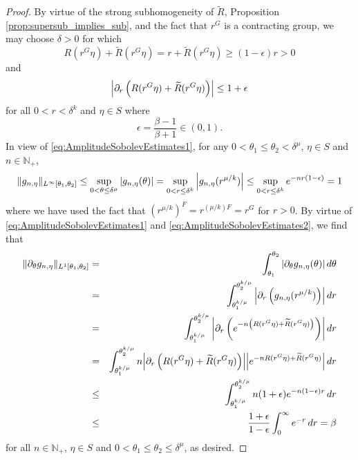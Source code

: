 \documentclass[11pt, letter]{book}
\newcommand{\lp}{\left(}
\newcommand{\rp}{\right)}
\newcommand{\p}{\partial}
\begin{document}
\begin{proof}
By virtue of the strong subhomogeneity of $\widetilde{R}$, Proposition \ref{prop:supersub_implies_sub}, and the fact that $r^G$ is a contracting group, we may choose $\delta>0$ for which 
\begin{equation}\label{eq:AmplitudeSobolevEstimates1}
    R(r^G\eta)+\widetilde{R}\left(r^G\eta\right)=r+\widetilde{R}\left(r^G\eta\right)\geq (1-\epsilon)r>0
\end{equation}
and
\begin{equation}\label{eq:AmplitudeSobolevEstimates2}
    \abs{\partial_r\left(R(r^G\eta)+\widetilde{R}(r^G\eta)\right)}\leq 1+\epsilon
\end{equation}
for all $0<r<\delta^k$ and $\eta\in S$ where
\begin{equation*}
    \epsilon=\frac{\beta-1}{\beta+1}\in(0,1).
\end{equation*}
In view of \eqref{eq:AmplitudeSobolevEstimates1}, for any $0<\theta_1\leq\theta_2<\delta^{\mu}$, $\eta\in S$ and $n\in\mathbb{N}_+$,
\begin{equation*}
\|g_{n,\eta}\|_{L^\infty[\theta_1,\theta_2]}\leq\sup_{0<\theta\leq\delta^{\mu}}\abs{g_{n,\eta}(\theta)}=\sup_{0<r\leq\delta^k}\abs{g_{n,\eta}(r^{\mu/k})}\leq \sup_{0<r\leq \delta^k}e^{-nr(1-\epsilon)}= 1
\end{equation*}
where we have used the fact that $(r^{\mu/k})^F=r^{(\mu/k)F}=r^G$ for $r>0$. By virtue of \eqref{eq:AmplitudeSobolevEstimates1} and \eqref{eq:AmplitudeSobolevEstimates2}, we find that
\begin{eqnarray*}
\|\partial_{\theta}g_{n,\eta}\|_{L^1[\theta_1,\theta_2]}
&=&\int_{\theta_1}^{\theta_2}\abs{\p_\theta g_{n,\eta}(\theta)}\,d\theta\\
&=&\int_{\theta_1^{k/\mu}}^{\theta_2^{k/\mu}}\abs{\p_r \lp g_{n,\eta}(r^{\mu/k})\rp}\,dr\\
&=&\int_{\theta_1^{k/\mu}}^{\theta_2^{k/\mu}}\abs{\p_r \left(e^{-n\left(R(r^G\eta)+\widetilde{R}(r^G\eta)\right)}\right) }\,dr\\
&=&\int_{\theta_1^{k/\mu}}^{\theta_2^{k/\mu}}n\abs{\partial_r\left(R(r^G\eta)+\widetilde{R}(r^G\eta)\right)}\abs{e^{-nR(r^G\eta)+\widetilde{R}(r^G\eta)}}\,dr\\
&\leq&\int_{\theta_1^{k/\mu}}^{\theta_2^{k/\mu}}n(1+\epsilon)e^{-n(1-\epsilon)r}\,dr\\
&\leq &\frac{1+\epsilon}{1-\epsilon}\int_0^\infty e^{-r}\,dr=\beta
\end{eqnarray*}
for all $n\in\mathbb{N}_+$, $\eta\in S$ and $0<\theta_1\leq\theta_2\leq\delta^{\mu}$, as desired.
\end{proof}
\end{document}
